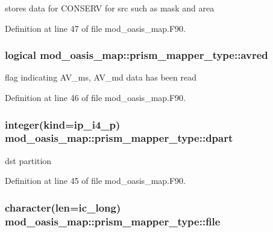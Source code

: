 stores data for C\+O\+N\+S\+E\+R\+V for src such as mask and area 



Definition at line 47 of file mod\+\_\+oasis\+\_\+map.\+F90.

\hypertarget{structmod__oasis__map_1_1prism__mapper__type_a270d69de9108f210fedbc3871d8a7a15}{
\subsubsection[{avred}]{\setlength{\rightskip}{0pt plus 5cm}logical mod\+\_\+oasis\+\_\+map\+::prism\+\_\+mapper\+\_\+type\+::avred\hspace{0.3cm}{\ttfamily [private]}}}\label{structmod__oasis__map_1_1prism__mapper__type_a270d69de9108f210fedbc3871d8a7a15}


flag indicating A\+V\+\_\+ms, A\+V\+\_\+md data has been read 



Definition at line 46 of file mod\+\_\+oasis\+\_\+map.\+F90.

\hypertarget{structmod__oasis__map_1_1prism__mapper__type_a8a597bf1362ebd82c03fdd6ac887620e}{
\subsubsection[{dpart}]{\setlength{\rightskip}{0pt plus 5cm}integer(kind=ip\+\_\+i4\+\_\+p) mod\+\_\+oasis\+\_\+map\+::prism\+\_\+mapper\+\_\+type\+::dpart\hspace{0.3cm}{\ttfamily [private]}}}\label{structmod__oasis__map_1_1prism__mapper__type_a8a597bf1362ebd82c03fdd6ac887620e}


dst partition 



Definition at line 45 of file mod\+\_\+oasis\+\_\+map.\+F90.

\hypertarget{structmod__oasis__map_1_1prism__mapper__type_a10ad0d8412afdfa993728ac63e117e9e}{
\subsubsection[{file}]{\setlength{\rightskip}{0pt plus 5cm}character(len=ic\+\_\+long) mod\+\_\+oasis\+\_\+map\+::prism\+\_\+mapper\+\_\+type\+::file\hspace{0.3cm}{\ttfamily [private]}}}\label{structmod__oasis__map_1_1prism__mapper__type_a10ad0d8412afdfa993728ac63e117e9e}


